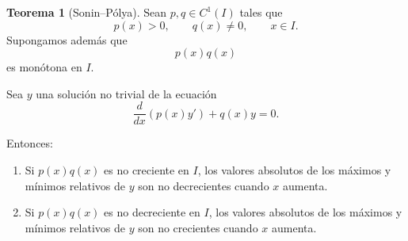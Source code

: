\documentclass[12pt,a4paper]{article}
\theoremstyle{definition}
\newtheorem{teorema}{Teorema}[section]
\begin{document}
\begin{teorema}[Sonin--Pólya]
Sean \(p,q\in C^1(I)\) tales que
\[
p(x)>0,\qquad q(x)\neq 0,\qquad x\in I.
\]
Supongamos además que
\[
p(x)q(x)
\]
es monótona en \(I\).

Sea \(y\) una solución no trivial de la ecuación
\begin{equation}\label{eq:sonin-polya}
\frac{d}{dx}\left(p(x)y'\right)+q(x)y=0.
\end{equation}

Entonces:

\begin{enumerate}
    \item Si \(p(x)q(x)\) es no creciente en \(I\), los valores absolutos de los máximos y mínimos relativos de \(y\) son no decrecientes cuando \(x\) aumenta.

    \item Si \(p(x)q(x)\) es no decreciente en \(I\), los valores absolutos de los máximos y mínimos relativos de \(y\) son no crecientes cuando \(x\) aumenta.
\end{enumerate}
\end{teorema}
\end{document}
